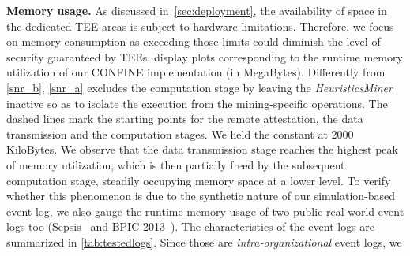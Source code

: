 \noindent\textbf{Memory usage.} \label{sec:evaluation:subsec:MemoryUsage} As discussed in~\cref{sec:deployment}, the availability of space in the dedicated TEE areas is subject to hardware limitations. Therefore, we focus on memory consumption as exceeding those limits could diminish the level of security guaranteed by TEEs.  display plots corresponding to the runtime memory utilization of our CONFINE implementation (in MegaBytes). Differently from \cref{snr_b}, \cref{snr_a} excludes the computation stage by leaving the \emph{HeuristicsMiner} inactive so as to isolate the execution from the mining-specific operations. %
The dashed lines mark %
the starting points for the remote attestation, the data transmission and the computation stages. %
We held the {\SegSize} constant at \num{2000} KiloBytes. %
We observe that the data transmission stage reaches the highest peak of memory utilization, %
which is then partially freed by the subsequent computation stage, steadily occupying memory space at a lower level. %
To verify whether this phenomenon is due to the synthetic nature of our simulation-based event log, we also gauge the runtime memory usage of two public real-world event logs too (Sepsis~\citep{seps} and BPIC 2013~\citep{bpic2013}). %
The characteristics of the event logs are summarized in \cref{tab:testedlogs}.
Since those are \textit{intra-organizational} event logs, we %
